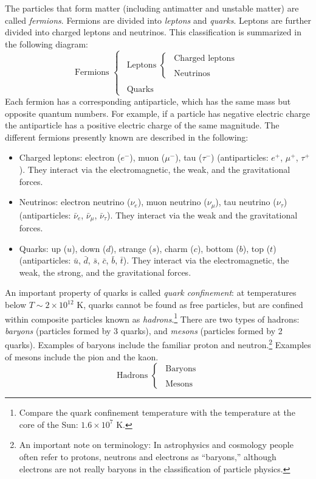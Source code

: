 The particles that form matter (including antimatter and unstable matter) are called {\it fermions}. Fermions are divided into {\it leptons} and {\it quarks}. Leptons are further divided into charged leptons and neutrinos. This classification is summarized in the following diagram:
\begin{equation*}
\mbox{Fermions }\begin{cases} \mbox{$~~$Leptons } \begin{cases} \mbox{$~~$Charged leptons}\\ ~\\ \mbox{$~~$Neutrinos}\end{cases}\\ 
~\\
\mbox{$~~$Quarks} \end{cases}
\end{equation*}
Each fermion has a corresponding antiparticle, which has the same mass but opposite quantum numbers. For example, if a particle has negative electric charge the antiparticle has a positive electric charge of the same magnitude. The different fermions presently known are described in the following:
\begin{itemize}
\item Charged leptons: electron ($e^{-}$), muon ($\mu^{-}$), tau ($\tau^{-}$) (antiparticles: $e^{+}$, $\mu^{+}$, $\tau^{+}$). They interact via the electromagnetic, the weak, and the gravitational forces.
\item Neutrinos: electron neutrino ($\nu_e$), muon neutrino ($\nu_{\mu}$), tau neutrino ($\nu_{\tau}$) (antiparticles: $\bar{\nu}_e$, $\bar{\nu}_{\mu}$, $\bar{\nu}_{\tau}$). They interact via the weak and the gravitational forces.
\item Quarks: up ($u$), down ($d$), strange ($s$), charm ($c$), bottom ($b$), top ($t$) (antiparticles: $\bar{u}$, $\bar{d}$, $\bar{s}$, $\bar{c}$, $\bar{b}$, $\bar{t}$). They interact via the electromagnetic, the weak, the strong, and the gravitational forces.
\end{itemize}
An important property of quarks is called {\it quark confinement}: at temperatures below $T\sim 2\times10^{12}$ K, quarks cannot be found as free particles, but are confined within composite particles known as {\it hadrons}.\footnote{Compare the quark confinement temperature with the temperature at the core of the Sun: $1.6\times10^7$ K.} There are two types of hadrons: {\it baryons} (particles formed by 3 quarks), and {\it mesons} (particles formed by 2 quarks). Examples of baryons include the familiar proton and neutron.\footnote{An important note on terminology: In astrophysics and cosmology people often refer to protons, neutrons and electrons as ``baryons,'' although electrons are not really baryons in the classification of particle physics.} Examples of mesons include the pion and the kaon.
\begin{equation*}
\mbox{Hadrons }\begin{cases} \mbox{$~~$Baryons} \\ 
~\\
\mbox{$~~$Mesons} \end{cases}
\end{equation*}

